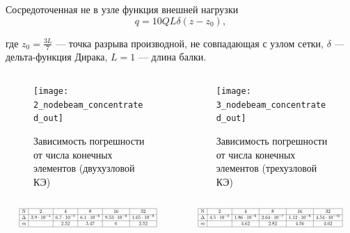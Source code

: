 \documentclass[7pt]{beamer}
\numberwithin{equation}{section}
\newcommand*{\Scale}[2][4]{\scalebox{#1}{$#2$}}
\begin{document}
	\begin{frame}{}
	\begin{block}{Сосредоточенная не в узле функция внешней нагрузки}
		\[q = 10 Q L  \delta (z - z_{0}),\]
	\end{block}
	где $z_{0}=\frac{3L}{7}$ --- точка разрыва производной, не совпадающая с узлом сетки, $\delta$ --- дельта-функция Дирака, $L=1$ --- длина балки. 
	\begin{columns}
		\begin{column}{0.57\textwidth}
			\begin{figure}[H]
				\centering
				\texttt{[image: 2\_nodebeam\_concentrated\_out]}
				\caption{Зависимость погрешности от числа конечных элементов (двухузловой КЭ)}
				\label{fig:2_nodebeam_concentrated_out}
			\end{figure}
		\end{column}
		\begin{column}{0.57\textwidth}
			\begin{figure}[H]
				\centering
				\texttt{[image: 3\_nodebeam\_concentrated\_out]}
				\caption{Зависимость погрешности от числа конечных элементов (трехузловой КЭ)}
				\label{fig:3_nodebeam_concentrated_out}
			\end{figure}
		\end{column}
	\end{columns}
	\begin{columns}
		\begin{column}{0.5\textwidth}
			\[
				\Scale[0.5] {
						\begin{array}{|c|c|c|c|c|c|}
							\hline
							\text{N} & 2 & 4 & 8 & 16 & 32\\ \hline
				\Delta  &3.9 \cdot 10^{-4} & 6.7 \cdot 10^{-5} & 6.1 \cdot 10^{-6} & 9.53 \cdot 10^{-8} & 1.65 \cdot 10^{-8} \\ \hline
				m  &  & 2.52 & 3.47 & 6 & 2.52 \\ 
							\hline
								\end{array}
				}
			\]
		\end{column}
		\begin{column}{0.5\textwidth}
			\[
					\Scale[0.5] {
			\begin{array}{|c|c|c|c|c|c|}
			\hline
			\text{N} & 2 & 4 & 8 & 16 & 32\\ \hline
				\Delta  & 4.5 \cdot 10^{-5} & 1.86 \cdot 10^{-6} & 2.64 \cdot 10^{-7} & 1.12 \cdot 10^{-8} & 4.54 \cdot 10^{-10} \\ \hline
				m  &  &  4.62 & 2.82 & 4.56 & 4.62 \\ 
			\hline
			\end{array}
				}
				\]
		\end{column}
	\end{columns}
\end{frame}
\end{document}
